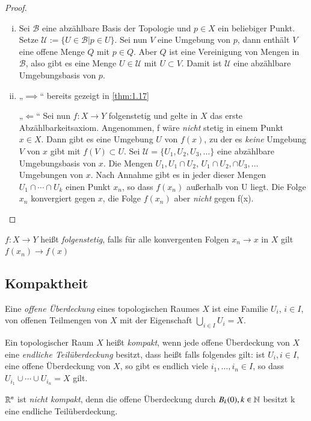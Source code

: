 \documentclass[a4paper,10pt]{scrartcl}
\begin{document}
\begin{proof}
 \begin{enumerate}[(i)]
  \item Sei $\mathcal B$ eine abzählbare Basis der Topologie und $p\in X$ ein beliebiger Punkt. Setze $\mathcal U:=\{U\in \mathcal{B} |p\in U\}$. Sei nun $V$ eine Umgebung von $p$, dann enthält $V$ eine offene Menge $Q$ mit $p\in Q$. Aber $Q$ ist eine Vereinigung von Mengen in $\mathcal B$, also gibt es eine Menge $U\in \mathcal U$ mit  $U \subset V$. Damit ist $ \mathcal U $ eine abzählbare Umgebungsbasis von $p$.
\item \begin{seg}{„$\implies$“} bereits gezeigt in \ref{thm:1.17} \end{seg}

\begin{seg}{„$\Longleftarrow$“} Sei nun $f:X\to Y$ folgenstetig und gelte in $X$ das erste Abzählbarkeitsaxiom. Angenommen, f wäre \emph{nicht} stetig in einem Punkt $x\in X$. Dann gibt es eine Umgebung $U$ von $f(x)$, zu der es \emph{keine} Umgebung $V$ von $x$ gibt mit $f(V)\subset U$. Sei $\mathcal U=\{U_1,U_2,U_3,\dotsc  \}$ eine abzählbare Umgebungsbasis von $x$. Die Mengen $U_1, U_1\cap U_2$, $U_1\cap U_2,\cap U_3,\dotsc  $ Umgebungen von $x$. Nach Annahme gibt es in jeder dieser Mengen $U_1\cap\dotsb \cap U_k$ einen Punkt $x_n$, so dass $f(x_n)$ außerhalb von U liegt. Die Folge $x_n$ konvergiert gegen $x$, die Folge $f(x_n)$ aber \emph{nicht} gegen f(x).
\end{seg}
\end{enumerate}
\end{proof}
\begin{note}
 $f: X\to Y$ heißt \emph{folgenstetig}, falls für alle konvergenten Folgen $x_n\to x$ in $X$ gilt $f(x_n)\to f(x)$ 
\end{note}
\subsection{Kompaktheit}
\begin{df}\label{thm:6.1}
 Eine \emph{offene Überdeckung} eines topologischen Raumes $X$ ist eine Familie $U_i$, $i\in I$, von offenen Teilmengen von $X$ mit der Eigenschaft $\bigcup_{i\in I} U_i=X$.
\end{df}
\begin{df}\label{thm:6.2}
 Ein topologischer Raum $X$ heißt \emph{kompakt}, wenn jede offene Überdeckung von $X$ eine \emph{endliche Teilüberdeckung} besitzt, dass heißt falls folgendes gilt: ist $U_i, i\in I$, eine offene Überdeckung von $X$, so gibt es endlich viele $i_1, \dotsc  ,i_n\in I$, so dass $U_{i_1}\cup \dotsb \cup U_{i_n}=X$ gilt.
\end{df}
\begin{ex*}
 $\mathbb{R}^n$ ist \emph{nicht kompakt}, denn die offene Überdeckung durch $B_k(0),k\in \mathbb{N}$ besitzt k          eine endliche Teilüberdeckung.
\end{ex*}
\end{document}
